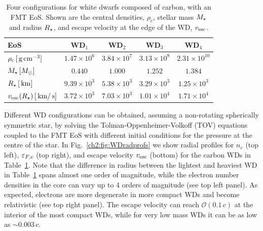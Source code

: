 \begin{table}[t]
  \centering
    \begin{tabular}{ l c c c c}
    \toprule
      EoS & WD$_1$  & WD$_2$ & WD$_3$ & WD$_4$\\
      \midrule\midrule
     $\rho_c\,[{\rm \,g}{\rm \,cm}^{-3}]$ &  $1.47\times 10^{6}$ & $3.84\times 10^{7} $ & $3.13\times 10^{8}$ & $2.31\times 10^{10}$\\
     $M_\star\,[M_\odot]$ & $0.440$ &  $1.000 $ & $1.252$ & $1.384$\\
     $R_\star\,[{\rm \,km}]$ & $9.39\times 10^{3}$ &  $5.38\times 10^{3}$ & $3.29\times 10^3$ & $1.25\times 10^3$\\
     $v_\mathrm{esc}(R_\star) \, [{\rm \,km}/{\rm \,s}]$ & $3.72\times 10^{3}$ & $7.03\times 10^{3}$ & $1.01\times 10^{4}$ & $1.71\times 10^{4}$ \\
      \bottomrule
    \end{tabular}
  \caption[Four configurations for white dwarfs composed of carbon, with an FMT EoS.]{Four configurations for white dwarfs composed of carbon, with an FMT EoS. Shown are the central densities, $\rho_c$, stellar mass $M_\star$ and radius $R_\star$, and escape velocity at the edge of the WD, $v_\mathrm{esc}$. }
    \label{ch2:tab:WDs}
\end{table}
 


Different WD configurations can be obtained, assuming a non-rotating spherically symmetric star, by solving the
Tolman-Oppenheimer-Volkoff (TOV) equations~\cite{Tolman:1939jz_StaticSolutionsEinstein,Oppenheimer:1939ne_MassiveNeutronCores} coupled to the FMT EoS with different initial conditions for the pressure at the centre of the star. In Fig.~\ref{ch2:fig:WDradprofs} we show radial profiles for $n_e$ (top left), $\varepsilon_{F,e}$ (top right), and escape velocity $v_\mathrm{esc}$ (bottom) for the carbon WDs in Table~\ref{ch2:tab:WDs}. Note that the difference in radius between the lightest and heaviest WD in Table~\ref{ch2:tab:WDs} spans almost one order of magnitude, while the electron number densities in the core can vary up to 4 orders of magnitude (see top left panel). As expected, electrons are more degenerate in more compact WDs and become relativistic (see top right panel). The escape velocity can reach ${\mathcal{O}}(0.1\,c)$ at the interior of the most compact WDs, while for very low mass WDs 
it can be as low as $\sim0.003\,c$. 

